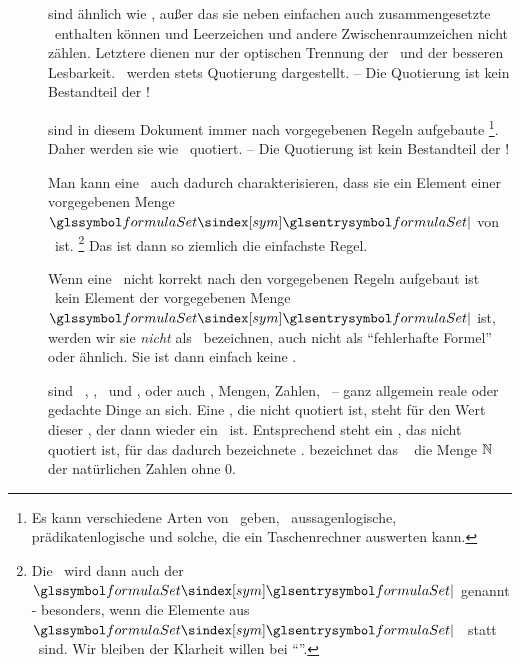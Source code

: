 \begin{description}
	\item [\Zeichenfolgen] sind ähnlich wie \Zeichenketten, außer das sie neben einfachen auch zusammengesetzte \Symbole\ enthalten können und Leerzeichen und andere Zwischenraumzeichen nicht zählen.
	Letztere dienen nur der optischen Trennung der \Symbole\ und der besseren Lesbarkeit.
	\Zeichenfolgen\ werden stets  Quotierung dargestellt.
	-- Die Quotierung ist kein Bestandteil der \Zeichenfolge!

	\item [\Formeln] \label{def-Formel} sind in diesem Dokument immer nach vorgegebenen Regeln aufgebaute \Zeichenfolgen%
	\footnote{%
		Es kann verschiedene Arten von \Formeln\ geben, \textzB\ aussagenlogische, prädikatenlogische und solche, die ein Taschenrechner auswerten kann.
	}.
	Daher werden sie wie \Zeichenfolgen\ quotiert.
	-- Die Quotierung ist kein Bestandteil der \Zeichenfolge!

	Man kann eine \Formel\ auch dadurch charakterisieren, dass sie ein Element einer vorgegebenen Menge $\symformulaSet$ von \Zeichenfolgen\ ist.%
	\footnote{%
		Die \Formel\ wird dann auch  der  $\symformulaSet$ genannt - besonders, wenn die Elemente aus $\symformulaSet$ \Zeichenketten\ statt \Zeichenfolgen\ sind.
		Wir bleiben der Klarheit willen bei \enquote{\Formel}.
	}
	Das ist dann so ziemlich die einfachste Regel.

	Wenn eine \Zeichenfolge\ nicht korrekt nach den vorgegebenen Regeln aufgebaut ist \textbzw\ kein Element der vorgegebenen Menge $\symformulaSet$ ist, werden wir sie \emph{nicht} als \Formel\ bezeichnen, auch nicht als \enquote{fehlerhafte Formel} oder ähnlich.
	Sie ist dann einfach keine \Formel.

	\item [\Objekte] sind \textzB\ \Symbole, \Zeichenketten, \Zeichenfolgen\ und \Formeln, oder auch \Aussagen, Mengen, Zahlen, \textusw\ -- ganz allgemein reale oder gedachte Dinge an sich.
	Eine \Formel, die nicht quotiert ist, steht für den Wert dieser \Formel, der dann wieder ein \Objekt\ ist.
	Entsprechend steht ein \Symbol, das nicht quotiert ist, für das dadurch bezeichnete \Objekt.
	\textZB bezeichnet das \Symbol\ \chrqt{$\IN$} die Menge $\IN$ der natürlichen Zahlen ohne 0.

\end{description}

